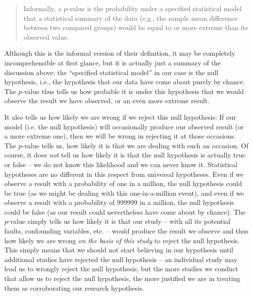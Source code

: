 \begin{quote}
Informally, a $p$\hyp{}value  is the probability under a specified statistical model that a statistical summary of the data (e.g., the sample mean difference between two compared groups) would be equal to or more extreme than its observed value. \citep[131]{wasserstein_asas_2016}
\end{quote}

Although this is the informal version of their definition, it may be completely incomprehensible at first glance, but it is actually just a summary of the discussion above: the ``specified statistical model'' in our case is the null hypothesis,  i.e., the hypothesis that our data have come about purely by chance.  The $p$\hyp{}value  thus tells us how probable it is under this hypothesis that we would observe the result we have observed, or an even more extreme result.

It also tells us how likely we are wrong if we reject this null hypothesis:  If our model (i.e. the null hypothesis) will occasionally produce our observed result (or a more extreme one), then we will be wrong in rejecting it at those occasions. The $p$\hyp{}value  tells us, how likely it is that we are dealing with such an occasion. Of course, it does \textit{not} tell us how likely it is that the null hypothesis is actually true or false -- we do not know this likelihood and we can never know it. Statistical hypotheses are no different in this respect from universal hypotheses. Even if we observe a result with a probability  of one in a million, the null hypothesis  could be true (as we might be dealing with this one\hyp{}in\hyp{}a\hyp{}million event),  and even if we observe a result with a probability of \num{999999} in a million, the null hypothesis could be false (as our result could nevertheless have come about by chance).  The $p$\hyp{}value  simply tells us how likely it is that our study -- with all its potential faults, confounding variables, etc. -- would produce the result we observe and thus how likely we are wrong \textit{on the basis of this study} to reject the null hypothesis.  This simply means that we should not start believing in our hypothesis until additional studies have rejected the null hypothesis -- an individual study may lead us to wrongly reject the null hypothesis, but the more studies we conduct that allow us to reject the null hypothesis, the more justified we are in treating them as corroborating  our research hypothesis.


